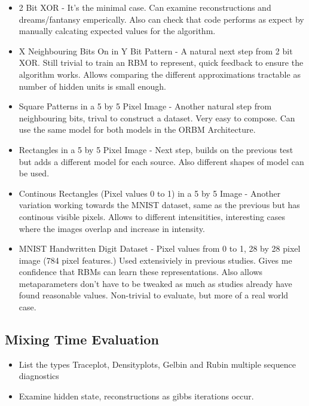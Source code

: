 \begin{itemize}
  \item 2 Bit XOR - It's the minimal case. Can examine reconstructions and dreams/fantansy emperically. Also can check that code performs as expect by manually calcating expected values for the algorithm.
  \item X Neighbouring Bits On in Y Bit Pattern - A natural next step from 2 bit XOR. Still trivial to train an RBM to represent, quick feedback to ensure the algorithm works. Allows comparing the different approximations tractable as number of hidden units is small enough.
  \item Square Patterns in a 5 by 5 Pixel Image - Another natural step from neighbouring bits, trival to construct a dataset. Very easy to compose. Can use the same model for both models in the ORBM Architecture.
  \item Rectangles in a 5 by 5 Pixel Image - Next step, builds on the previous test but adds a different model for each source. Also different shapes of model can be used.
  \item Continous Rectangles (Pixel values 0 to 1) in a 5 by 5 Image - Another variation working towards the MNIST dataset, same as the previous but has continous visible pixels. Allows to different intensitities, interesting cases where the images overlap and increase in intensity.
  \item MNIST Handwritten Digit Dataset - Pixel values from 0 to 1, 28 by 28 pixel image (784 pixel features.) Used extensiviely in previous studies. Gives me confidence that RBMs can learn these representations. Also allows metaparameters don't have to be tweaked as much as studies already have found reasonable values. Non-trivial to evaluate, but more of a real world case.
\end{itemize}


\subsection{Mixing Time Evaluation}
  \begin{itemize}
    \item List the types Traceplot, Densityplots, Gelbin and Rubin multiple sequence diagnostics
    \item Examine hidden state, reconstructions as gibbs iterations occur.
  \end{itemize}


